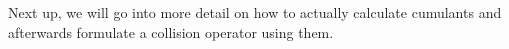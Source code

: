 Next up, we will go into more detail on how to actually calculate cumulants and afterwards formulate a collision operator using them.

